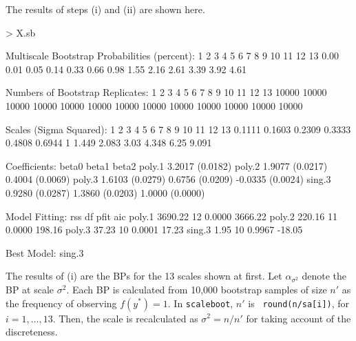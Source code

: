 \documentclass[a4paper]{amsart}
\begin{document}
The results of steps (i) and (ii) are shown here.
\begin{Schunk}
\begin{Sinput}
> X.sb
\end{Sinput}
\begin{Soutput}
Multiscale Bootstrap Probabilities (percent):
1    2    3    4    5    6    7    8    9    10   11   12   13   
0.00 0.01 0.05 0.14 0.33 0.66 0.98 1.55 2.16 2.61 3.39 3.92 4.61 

Numbers of Bootstrap Replicates:
1     2     3     4     5     6     7     8     9     10    11    12    13    
10000 10000 10000 10000 10000 10000 10000 10000 10000 10000 10000 10000 10000 

Scales (Sigma Squared):
1      2      3      4      5      6      7 8     9     10   11    12   13    
0.1111 0.1603 0.2309 0.3333 0.4808 0.6944 1 1.449 2.083 3.03 4.348 6.25 9.091 

Coefficients:
       beta0           beta1           beta2            
poly.1 3.2017 (0.0182)                                  
poly.2 1.9077 (0.0217) 0.4004 (0.0069)                  
poly.3 1.6103 (0.0279) 0.6756 (0.0209) -0.0335 (0.0024) 
sing.3 0.9280 (0.0287) 1.3860 (0.0203)  1.0000 (0.0000) 

Model Fitting:
       rss     df pfit   aic     
poly.1 3690.22 12 0.0000 3666.22 
poly.2  220.16 11 0.0000  198.16 
poly.3   37.23 10 0.0001   17.23 
sing.3    1.95 10 0.9967  -18.05 

Best Model:  sing.3 
\end{Soutput}
\end{Schunk}

The results of (i) are the BPs for the 13 scales shown at first. Let
$\alpha_{\sigma^2}$ denote the BP at scale $\sigma^2$. Each BP is
calculated from 10,000 bootstrap samples of size $n'$ as the frequency
of observing $f(y^*)=1$. In {\tt scaleboot}, $n'$ is {\tt
round(n/sa[i])}, for $i=1,\ldots,13$. Then, the scale is recalculated
as $\sigma^2=n/n'$ for taking account of the discreteness. 
\end{document}
